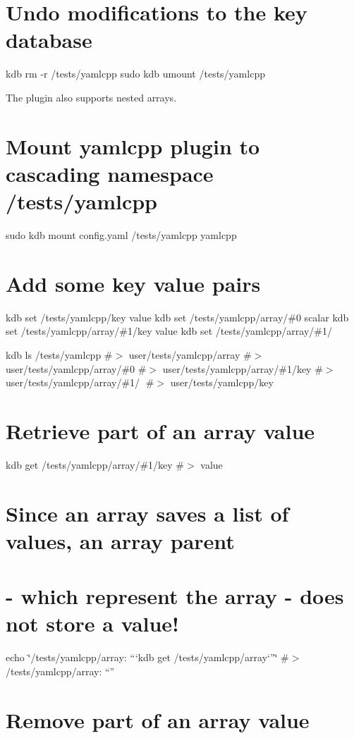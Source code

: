 \section*{Undo modifications to the key database}

kdb rm -\/r /tests/yamlcpp sudo kdb umount /tests/yamlcpp 
\begin{DoxyCode}
The plugin also supports nested arrays.
\end{DoxyCode}
 \section*{Mount yamlcpp plugin to cascading namespace {\ttfamily /tests/yamlcpp}}

sudo kdb mount config.\+yaml /tests/yamlcpp yamlcpp

\section*{Add some key value pairs}

kdb set /tests/yamlcpp/key value kdb set /tests/yamlcpp/array/\#0 scalar kdb set /tests/yamlcpp/array/\#1/key value kdb set /tests/yamlcpp/array/\#1/🔑 🙈

kdb ls /tests/yamlcpp \#$>$ user/tests/yamlcpp/array \#$>$ user/tests/yamlcpp/array/\#0 \#$>$ user/tests/yamlcpp/array/\#1/key \#$>$ user/tests/yamlcpp/array/\#1/🔑 \#$>$ user/tests/yamlcpp/key

\section*{Retrieve part of an array value}

kdb get /tests/yamlcpp/array/\#1/key \#$>$ value

\section*{Since an array saves a list of values, an array parent}

\section*{-\/ which represent the array -\/ does not store a value!}

echo \char`\"{}/tests/yamlcpp/array\+: “`kdb get /tests/yamlcpp/array`”\char`\"{} \#$>$ /tests/yamlcpp/array\+: “”

\section*{Remove part of an array value}

